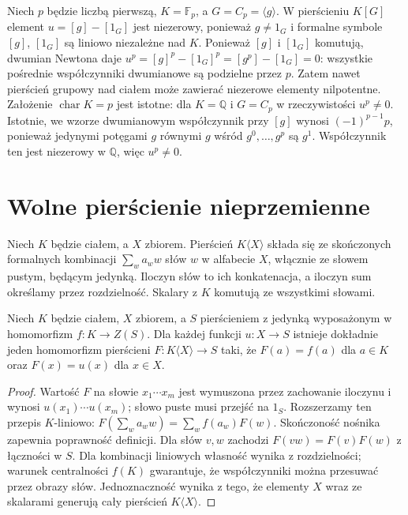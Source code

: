 \begin{przyklad}
\label{aa:prz:nc-group-ring-nilpotent}
Niech $p$ będzie liczbą pierwszą, $K=\mathbb F_p$,
a $G=C_p=\langle g\rangle$. W pierścieniu $K[G]$
element $u=[g]-[1_G]$ jest niezerowy, ponieważ $g\ne1_G$
i formalne symbole $[g]$, $[1_G]$ są liniowo niezależne nad $K$.
Ponieważ $[g]$ i $[1_G]$ komutują, dwumian Newtona daje
$u^p=[g]^p-[1_G]^p=[g^p]-[1_G]=0$:
wszystkie pośrednie współczynniki dwumianowe są podzielne
przez $p$. Zatem nawet pierścień grupowy nad ciałem
może zawierać niezerowe elementy nilpotentne. Założenie
$\operatorname{char}K=p$ jest istotne: dla $K=\mathbb Q$
i $G=C_p$ w rzeczywistości $u^p\ne0$.
Istotnie, we wzorze dwumianowym współczynnik przy
$[g]$ wynosi $(-1)^{p-1}p$, ponieważ jedynymi
potęgami $g$ równymi $g$ wśród $g^0,\ldots,g^p$
są $g^1$. Współczynnik ten jest niezerowy w
$\mathbb Q$, więc $u^p\ne0$.
\end{przyklad}

\section{Wolne pierścienie nieprzemienne}
\begin{definicja}
\label{aa:def:nc-free-associative}
Niech $K$ będzie ciałem, a $X$ zbiorem. Pierścień
$K\langle X\rangle$ składa się ze skończonych
formalnych kombinacji $\sum_w a_ww$ słów $w$ w
alfabecie $X$, włącznie ze słowem pustym, będącym
jedynką. Iloczyn słów to ich konkatenacja,
a iloczyn sum określamy przez rozdzielność.
Skalary z $K$ komutują ze wszystkimi słowami.
\end{definicja}

\begin{twierdzenie}
\label{aa:tw:nc-free-universal}
Niech $K$ będzie ciałem, $X$ zbiorem, a $S$ pierścieniem
z jedynką wyposażonym w homomorfizm $f:K\to Z(S)$.
Dla każdej funkcji $u:X\to S$ istnieje dokładnie jeden
homomorfizm pierścieni $F:K\langle X\rangle\to S$
taki, że $F(a)=f(a)$ dla $a\in K$ oraz
$F(x)=u(x)$ dla $x\in X$.
\end{twierdzenie}
\begin{proof}
Wartość $F$ na słowie $x_1\cdots x_m$ jest wymuszona
przez zachowanie iloczynu i wynosi
$u(x_1)\cdots u(x_m)$; słowo puste musi przejść na
$1_S$. Rozszerzamy ten przepis $K$-liniowo:
$F(\sum_w a_ww)=\sum_w f(a_w)F(w)$.
Skończoność nośnika zapewnia poprawność definicji.
Dla słów $v,w$ zachodzi $F(vw)=F(v)F(w)$ z
łączności w $S$. Dla kombinacji liniowych własność
wynika z rozdzielności; warunek centralności $f(K)$
gwarantuje, że współczynniki można przesuwać
przez obrazy słów. Jednoznaczność wynika z tego,
że elementy $X$ wraz ze skalarami generują cały
pierścień $K\langle X\rangle$.
\end{proof}

